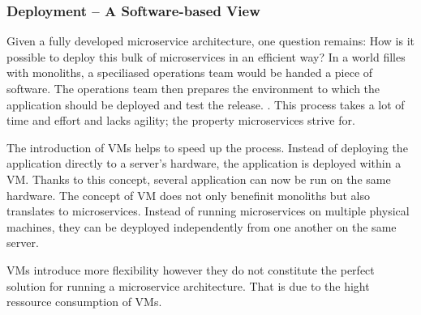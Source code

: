 \subsubsection{Deployment -- A Software-based View}%
\label{ssub:Deployment_-_A_Software-based_View}

Given a fully developed microservice architecture, one question remains: How is
it possible to deploy this bulk of microservices in an efficient way? In a
world filles with monoliths, a speciliased operations team would be handed a
piece of software. The operations team then prepares the environment to which
the application should be deployed and test the release.
\autocite{VillamizarEvaluatingmonolithicmicroservice2015}. This process takes a
lot of time and effort and lacks agility; the property microservices strive
for.

The introduction of \acp{VM} helps to speed up the process. Instead of
deploying the application directly to a server's hardware, the application is
deployed within a \ac{VM}. Thanks to this concept, several application can now
be run on the same hardware. The concept of \acs{VM} does not only benefinit
monoliths but also translates to microservices. Instead of running
microservices on multiple physical machines, they can be deyployed
independently from one another on the same server.

\acp{VM} introduce more flexibility however they do not constitute the perfect
solution for running a microservice architecture. That is due to the hight
ressource consumption of \acp{VM}.

